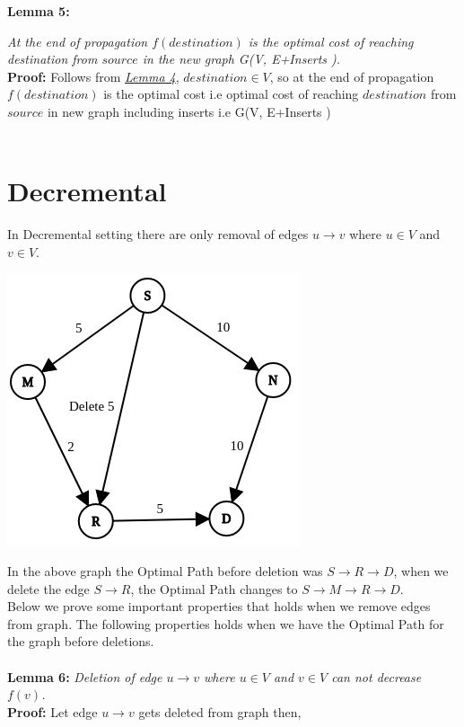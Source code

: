 \documentclass[a4paper]{article}
\begin{document}
\hypertarget{Lemma 5}{\textbf{Lemma 5:}}\textit{At the end of propagation $f(destination)$ is the optimal cost of reaching destination from $source$ in the new graph G(V, E+Inserts ).}\\
\textbf{Proof:} Follows from \hyperlink{Lemma 4}{\textit{Lemma 4}}, $destination \in V$, so at the end of propagation $f(destination)$ is the optimal cost i.e optimal cost of reaching $destination$ from $source$ in new graph including inserts i.e G(V, E+Inserts )\\
\\

\section{Decremental}
In Decremental setting there are only removal of edges $u \rightarrow v$ where $u \in V$ and $v \in V$.\\
\begin{center}
\includegraphics[scale=0.4]{img/Delete2.png}    
\end{center}
In the above graph the Optimal Path before deletion was $S \rightarrow R \rightarrow D$, when we delete the edge $S \rightarrow R$, the Optimal Path changes to $S \rightarrow M \rightarrow R \rightarrow D$.\\
Below we prove some important properties that holds when we remove edges from graph. The following properties holds when we have the Optimal Path for the graph before deletions.\\
\\
\hypertarget{Lemma 6}{\textbf{Lemma 6:}} \textit{Deletion of edge $ u \rightarrow v$ where $u \in V$ and $v \in V$ can not decrease $f(v)$.}\\
\textbf{Proof:} Let edge $ u \rightarrow v$ gets deleted from graph then,
\end{document}
